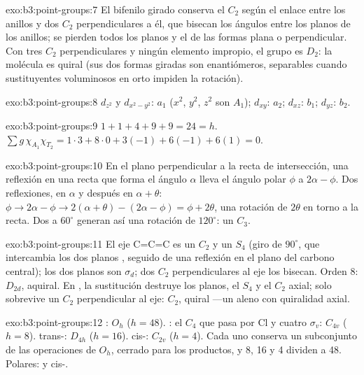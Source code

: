 \begin{solution}{exo:b3:point-groups:7}
El bifenilo girado conserva el $C_2$ según el enlace entre los anillos y dos $C_2$
perpendiculares a él, que bisecan los ángulos entre los planos de los anillos; se pierden
todos los planos y el  de las formas plana o perpendicular.
Con tres $C_2$ perpendiculares y ningún elemento impropio, el grupo es
$D_2$: la molécula es quiral (sus dos formas giradas son enantiómeros,
separables cuando sustituyentes voluminosos en orto impiden la rotación).
\end{solution}

\begin{solution}{exo:b3:point-groups:8}
$d_{z^2}$ y $d_{x^2-y^2}$: $a_1$ ($x^2$, $y^2$, $z^2$ son $A_1$); $d_{xy}$: $a_2$; $d_{xz}$:
$b_1$; $d_{yz}$: $b_2$.
\end{solution}

\begin{solution}{exo:b3:point-groups:9}
$1 + 1 + 4 + 9 + 9 = 24 = h$. $\sum g\,\chi_{A_1}\chi_{T_2} = 1\cdot3 + 8\cdot0 + 3(-1)
+ 6(-1) + 6(1) = 0$.
\end{solution}

\begin{solution}{exo:b3:point-groups:10}
En el plano perpendicular a la recta de intersección, una reflexión en una recta
que forma el ángulo $\alpha$ lleva el ángulo polar $\phi$ a $2\alpha - \phi$. Dos reflexiones, en
$\alpha$ y después en $\alpha + \theta$: $\phi \to 2\alpha - \phi \to 2(\alpha + \theta) - (2\alpha - \phi) =
\phi + 2\theta$, una rotación de $2\theta$ en torno a la recta. Dos  a
$60^\circ$ generan así una rotación de $120^\circ$: un $C_3$.
\end{solution}

\begin{solution}{exo:b3:point-groups:11}
El eje C=C=C es un $C_2$ y un $S_4$ (giro de $90^\circ$, que intercambia los
dos planos , seguido de una reflexión en el plano del carbono central); los dos
planos  son $\sigma_d$; dos $C_2$ perpendiculares al eje los bisecan.
Orden 8: $D_{2d}$, aquiral. En , la sustitución destruye los planos, el $S_4$ y el
$C_2$ axial; solo sobrevive un $C_2$ perpendicular al
eje: $C_2$, quiral ---un aleno con quiralidad axial.
\end{solution}

\begin{solution}{exo:b3:point-groups:12}
: $O_h$ ($h = 48$). : el $C_4$ que pasa por Cl y cuatro $\sigma_v$:
$C_{4v}$ ($h = 8$). trans-: $D_{4h}$ ($h = 16$). cis-: $C_{2v}$ ($h
= 4$). Cada uno conserva un subconjunto de las operaciones de $O_h$, cerrado para los productos,
y 8, 16 y 4 dividen a 48. Polares:  y cis-.
\end{solution}

